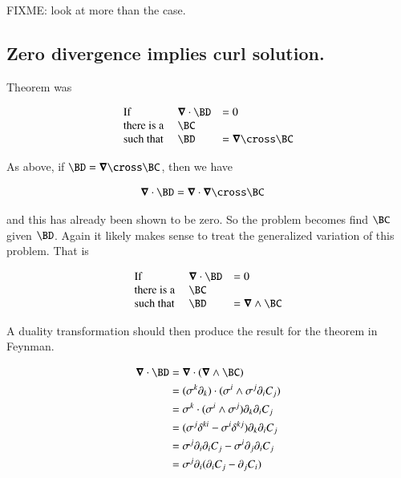 \documentclass{article}
\begin{document}
FIXME: look at more than the  case.

\subsection{ Zero divergence implies curl solution. }

Theorem was

\begin{equation*}
\begin{array}{l l l}
\text{If} &                 \spacegrad \cdot \BD &= 0 \\
\text{there is a } &                         \BC &    \\
\text{such that  } & \BD &= \spacegrad \cross \BC \\
\end{array} 
\end{equation*}

As above, if $\BD = \spacegrad \cross \BC$, then we have

\begin{align*}
\spacegrad \cdot \BD &= \spacegrad \cdot \spacegrad \cross \BC 
\end{align*}

and this has already been shown to be zero.  So the problem becomes find $\BC$ given $\BD$.  Again it likely makes sense to treat the
generalized variation of this problem.  That is

\begin{equation*}
\begin{array}{l l l}
\text{If} &                 \spacegrad \cdot \BD &= 0 \\
\text{there is a } &                         \BC &    \\
\text{such that  } & \BD &= \spacegrad \wedge \BC \\
\end{array} 
\end{equation*}

A duality transformation should then produce the result for the theorem in Feynman.

\begin{align*}
\spacegrad \cdot \BD 
&= \spacegrad \cdot (\spacegrad \wedge \BC) \\
&= (\sigma^k \partial_k) \cdot (\sigma^i \wedge \sigma^j \partial_i C_j) \\
&= \sigma^k \cdot (\sigma^i \wedge \sigma^j) \partial_k \partial_i C_j \\
&= ( \sigma^j \delta^{ki} - \sigma^i \delta^{kj} ) \partial_k \partial_i C_j \\
&= \sigma^j \partial_i \partial_i C_j - \sigma^i \partial_j \partial_i C_j \\
&= \sigma^j \partial_i (\partial_i C_j -\partial_j C_i) \\
\end{align*}
\end{document}
